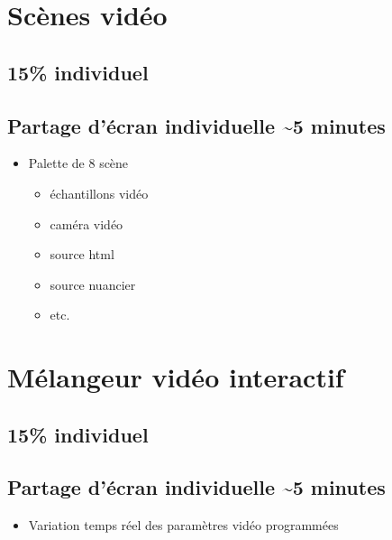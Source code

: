 \documentclass[
]{book}
\providecommand{\tightlist}{%
  \setlength{\itemsep}{0pt}\setlength{\parskip}{0pt}}
\begin{document}
\hypertarget{sommatif_4}{%
\section{Scènes vidéo}\label{sommatif_4}}

\hypertarget{individuel-2}{%
\subsection{15\% individuel}\label{individuel-2}}

\hypertarget{partage-duxe9cran-individuelle-5-minutes}{%
\subsection{Partage d'écran individuelle \textasciitilde5 minutes}\label{partage-duxe9cran-individuelle-5-minutes}}

\begin{itemize}
\tightlist
\item
  Palette de 8 scène

  \begin{itemize}
  \tightlist
  \item
    échantillons vidéo
  \item
    caméra vidéo
  \item
    source html
  \item
    source nuancier
  \item
    etc.
  \end{itemize}
\end{itemize}

\hypertarget{sommatif_5}{%
\section{Mélangeur vidéo interactif}\label{sommatif_5}}

\hypertarget{individuel-3}{%
\subsection{15\% individuel}\label{individuel-3}}

\hypertarget{partage-duxe9cran-individuelle-5-minutes-1}{%
\subsection{Partage d'écran individuelle \textasciitilde5 minutes}\label{partage-duxe9cran-individuelle-5-minutes-1}}

\begin{itemize}
\tightlist
\item
  Variation temps réel des paramètres vidéo programmées
\end{itemize}
\end{document}
